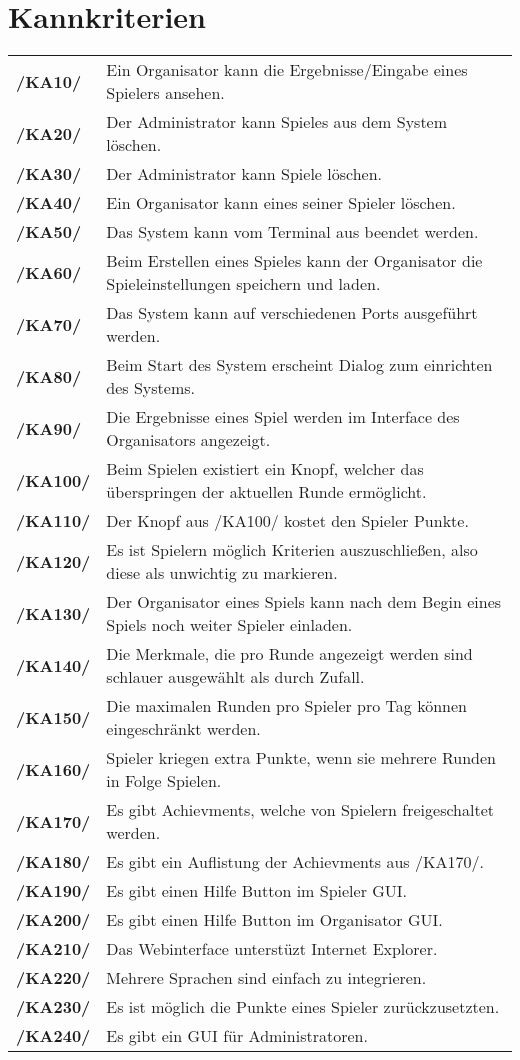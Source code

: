 \documentclass[a4paper]{scrreprt}
\begin{document}
\section{Kannkriterien}
\begin{tabularx}{\linewidth}{@{}>{\bfseries}l@{\hspace{.5em}}X@{}} %
/KA10/ & Ein \Gls{Organisator} kann die Ergebnisse/Eingabe eines Spielers ansehen. \\
/KA20/ & Der \Gls{Administrator} kann Spieles aus dem System löschen. \\
/KA30/ & Der \Gls{Administrator} kann Spiele löschen. \\
/KA40/ & Ein \Gls{Organisator} kann eines seiner \Gls{Spieler} löschen. \\
/KA50/ & Das System kann vom Terminal aus beendet werden. \\
/KA60/ & Beim Erstellen eines Spieles kann der \Gls{Organisator} die \Gls{Spieleinstellungen} speichern und laden. \\
/KA70/ & Das System kann auf verschiedenen Ports ausgeführt werden. \\
/KA80/ & Beim Start des System erscheint Dialog zum einrichten des Systems. \\
/KA90/ & Die Ergebnisse eines \Gls{Spiel} werden im Interface des \Gls{Organisator}s angezeigt. \\
/KA100/ & Beim Spielen existiert ein Knopf, welcher das überspringen der aktuellen Runde ermöglicht. \\
/KA110/ & Der Knopf aus /KA100/ kostet den \Gls{Spieler} Punkte. \\
/KA120/ & Es ist \Gls{Spieler}n möglich Kriterien auszuschließen, also diese als unwichtig zu markieren. \\
/KA130/ & Der \Gls{Organisator} eines Spiels kann nach dem Begin eines Spiels noch weiter Spieler einladen. \\
/KA140/ & Die Merkmale, die pro Runde angezeigt werden sind schlauer ausgewählt als durch Zufall. \\
/KA150/ & Die maximalen Runden pro Spieler pro Tag können eingeschränkt werden. \\
/KA160/ & \Gls{Spieler} kriegen extra Punkte, wenn sie mehrere Runden in Folge Spielen. \\
/KA170/ & Es gibt \Gls{Achievment}s, welche von Spielern freigeschaltet werden. \\
/KA180/ & Es gibt ein Auflistung der \Gls{Achievment}s aus /KA170/. \\
/KA190/ & Es gibt einen Hilfe Button im \Gls{Spieler} GUI. \\
/KA200/ & Es gibt einen Hilfe Button im \Gls{Organisator} GUI. \\
/KA210/ & Das Webinterface unterstüzt Internet Explorer. \\
/KA220/ & Mehrere Sprachen sind einfach zu integrieren. \\ 
/KA230/ & Es ist möglich die Punkte eines \Gls{Spieler} zurückzusetzten. \\
/KA240/ & Es gibt ein GUI für \Gls{Administrator}en. \\
\end{tabularx} 
\end{document}
